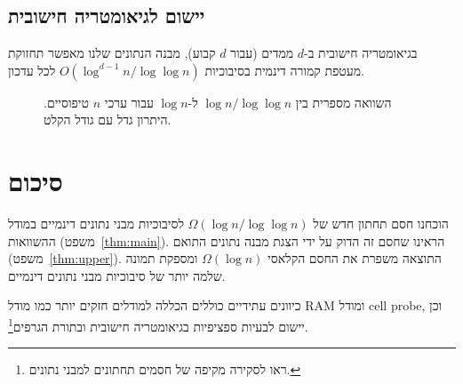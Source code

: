\documentclass[12pt,a4paper]{article}
\theoremstyle{plain}
\theoremstyle{definition}
\theoremstyle{remark}
\begin{document}
\subsection{יישום לגיאומטריה חישובית}

בגיאומטריה חישובית ב-$d$ ממדים (עבור $d$ קבוע), מבנה
הנתונים שלנו מאפשר תחזוקת מעטפת קמורה דינמית
בסיבוכיות $O(\log^{d-1} n / \log \log n)$ לכל עדכון.

\begin{figure}[ht]
\centering
{}
\caption{השוואה מספרית בין $\log n / \log \log n$ ל-$\log n$
עבור ערכי $n$ טיפוסיים. היתרון גדל עם גודל הקלט.}
\label{fig:growth}
\end{figure}

\section{סיכום}
\label{sec:conclusion}

הוכחנו חסם תחתון חדש של $\Omega(\log n / \log \log n)$ לסיבוכיות
מבני נתונים דינמיים במודל ההשוואות (משפט~\ref{thm:main}).
הראינו שחסם זה הדוק על ידי הצגת מבנה נתונים התואם
(משפט~\ref{thm:upper}). התוצאה משפרת את החסם הקלאסי
$\Omega(\log n)$ ומספקת תמונה שלמה יותר של סיבוכיות
מבני נתונים דינמיים.

כיוונים עתידיים כוללים הכללה למודלים חזקים יותר כמו
מודל RAM ומודל cell probe, וכן יישום לבעיות ספציפיות
בגיאומטריה חישובית ובתורת הגרפים\footnote{%
ראו \citet{demaine2007} לסקירה מקיפה של חסמים תחתונים
למבני נתונים.}.
\end{document}
